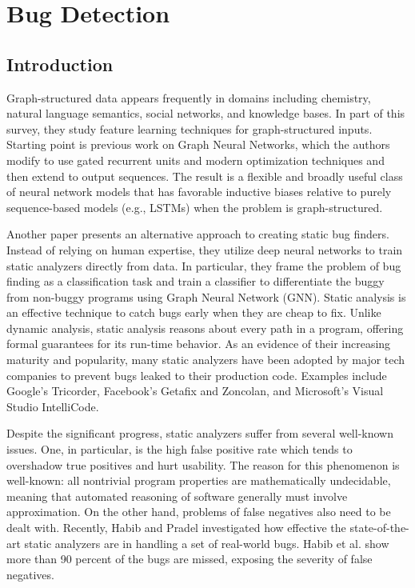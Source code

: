 \documentclass{article}
\begin{document}
\section{Bug Detection}
\subsection{Introduction}
Graph-structured data appears frequently in domains including chemistry, natural language semantics, social networks, and knowledge bases. In part of this survey, they study feature learning techniques for graph-structured inputs. Starting point is previous work on Graph Neural Networks, which the authors modify to use gated recurrent units and modern optimization techniques and then extend to output sequences. The result is a flexible and broadly useful class of neural network models that has favorable inductive biases relative to purely sequence-based models (e.g., LSTMs) when the problem is graph-structured.

Another paper presents an alternative approach to creating static bug finders. Instead of relying on human expertise, they utilize deep neural networks to train static analyzers directly from data. In particular, they frame the problem of bug finding as a classification task and train a classifier to differentiate the buggy from non-buggy programs using Graph Neural Network (GNN). Static analysis is an effective technique to catch bugs early when they are cheap to fix. Unlike dynamic analysis, static analysis reasons about every path in a program, offering formal guarantees for its run-time behavior. As an evidence of their increasing maturity and popularity, many static analyzers have been adopted by major tech companies to prevent bugs leaked to their production code. Examples include Google’s Tricorder, Facebook’s Getafix and Zoncolan, and Microsoft’s Visual Studio IntelliCode.

Despite the significant progress, static analyzers suffer from several well-known issues. One, in particular, is the high false positive rate which tends to overshadow true positives and hurt usability. The reason for this phenomenon is well-known: all nontrivial program properties are mathematically undecidable, meaning that automated reasoning of software generally must involve approximation. On the other hand, problems of false negatives also need to be dealt with. Recently, Habib and Pradel investigated how effective the state-of-the-art static analyzers are in handling a set of real-world bugs. Habib et al. show more than 90 percent of the bugs are missed, exposing the severity of false negatives.
\end{document}
